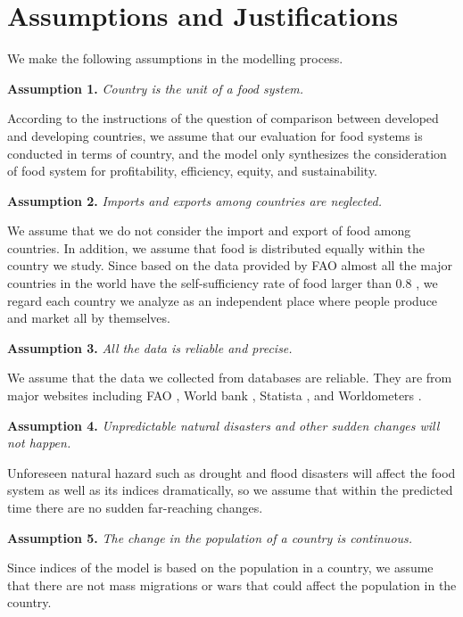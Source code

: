 \documentclass[12pt]{article}
\begin{document}
\section{Assumptions and Justifications}

We make the following assumptions in the modelling process. 

\noindent \textbf{Assumption 1.} \textit{Country is the unit of a food system.}

According to the instructions of the question of comparison between developed and developing countries, we assume that our evaluation for food systems is conducted in terms of country, and the model only synthesizes the consideration of food system for profitability, efficiency, equity, and sustainability.

\noindent \textbf{Assumption 2.} \textit{Imports and exports among countries are neglected.}

We assume that we do not consider the import and export of food among countries. In addition, we assume that food is distributed equally within the country we study. Since based on the data provided by FAO almost all the major countries in the world have the self-sufficiency rate of food larger than 0.8 \cite{cite:Self_support}, we regard each country we analyze as an independent place where people produce and market all by themselves. 

\noindent \textbf{Assumption 3.} \textit{All the data is reliable and precise.}

We assume that the data we collected from databases are reliable. They are from major websites including FAO \cite{cite:FAO_data}, World bank \cite{cite:Worldbank}, Statista \cite{cite:Statista}, and Worldometers \cite{cite:Worldometers}.

\noindent \textbf{Assumption 4.} \textit{Unpredictable natural disasters and other sudden changes will not happen.}

Unforeseen natural hazard such as drought and flood disasters will affect the food system as well as its indices dramatically, so we assume that within the predicted time there are no sudden far-reaching changes.

\noindent \textbf{Assumption 5.} \textit{The change in the population of a country is continuous.}

Since indices of the model is based on the population in a country, we assume that there are not mass migrations or wars that could affect the population in the country. 

\end{document}
